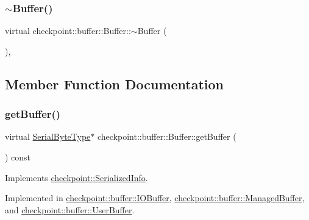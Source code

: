 \subsubsection{\texorpdfstring{$\sim$\+Buffer()}{~Buffer()}}
{\footnotesize\ttfamily virtual checkpoint\+::buffer\+::\+Buffer\+::$\sim$\+Buffer (\begin{DoxyParamCaption}{ }\end{DoxyParamCaption})\hspace{0.3cm}{\ttfamily [inline]}, {\ttfamily [virtual]}}



\subsection{Member Function Documentation}
\mbox{\label{structcheckpoint_1_1buffer_1_1_buffer_ad6a6457df5d7020cd3622d353eb8394b}} 
\subsubsection{\texorpdfstring{get\+Buffer()}{getBuffer()}}
{\footnotesize\ttfamily virtual \hyperlink{namespacecheckpoint_ae57f01cdc0b81776c23b6c7c934c58f5}{Serial\+Byte\+Type}$\ast$ checkpoint\+::buffer\+::\+Buffer\+::get\+Buffer (\begin{DoxyParamCaption}{ }\end{DoxyParamCaption}) const\hspace{0.3cm}{\ttfamily [pure virtual]}}



Implements \hyperlink{structcheckpoint_1_1_serialized_info_aa941e773b665a69a856996d243e7f2c7}{checkpoint\+::\+Serialized\+Info}.



Implemented in \hyperlink{structcheckpoint_1_1buffer_1_1_i_o_buffer_ac0ff5457dbbec216ce8620ad25e283fa}{checkpoint\+::buffer\+::\+I\+O\+Buffer}, \hyperlink{structcheckpoint_1_1buffer_1_1_managed_buffer_a9a44d0c4e088ac080f13c84072a86e91}{checkpoint\+::buffer\+::\+Managed\+Buffer}, and \hyperlink{structcheckpoint_1_1buffer_1_1_user_buffer_a1a71a6378472d56c8c17f01dd44462b7}{checkpoint\+::buffer\+::\+User\+Buffer}.

\mbox{\label{structcheckpoint_1_1buffer_1_1_buffer_a4d78cd3d4ab338bab7911fac4fe9434d}} 
